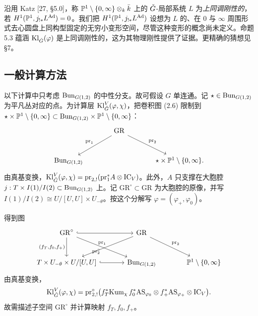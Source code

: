 \begin{remark}
沿用 Katz [27, §5.0]，称 $\mathbb{P}^1\setminus\{0,\infty\}\otimes_k\bar k$ 上的 $\check G$-局部系统 $L$ 为\emph{上同调刚性的}，若 $H^1(\mathbb{P}^1,j_{!*}L^{\mathrm{Ad}})=0$。我们把 $H^1(\mathbb{P}^1,j_{!*}L^{\mathrm{Ad}})$ 设想为 $L$ 的、在 $0$ 与 $\infty$ 周围形式去心圆盘上同构型固定的无穷小变形空间，尽管这种变形的概念尚未定义。命题 5.3 蕴涵 $\mathrm{Kl}_{\check G}(\varphi)$ 是上同调刚性的，这为其物理刚性提供了证据。更精确的猜想见 §7。
\end{remark}

\subsection{一般计算方法}

以下计算中只考虑 $\mathrm{Bun}_{G(1,2)}$ 的中性分支。故可假设 $G$ 单连通。记 $\star\in\mathrm{Bun}_{G(1,2)}$ 为平凡丛对应的点。为计算层 $\mathrm{Kl}^V_{\check G}(\varphi,\chi)$，把卷积图 (2.6) 限制到 $\star\times\mathbb{P}^1\setminus\{0,\infty\}\subset\mathrm{Bun}_{G(1,2)}\times\mathbb{P}^1\setminus\{0,\infty\}$：
\[
\begin{tikzcd}[column sep=large, row sep=large]
& \mathrm{GR} \arrow[dl, "\mathrm{pr}_1"'] \arrow[dr, "\mathrm{pr}_2"] & \\
\Bun_{G(1,2)} & & \star\times\PP^1\setminus\{0,\infty\}.
\end{tikzcd}
\]
由真基变换，$\mathrm{Kl}^V_{\check G}(\varphi,\chi)=\mathrm{pr}_{2,!}(\mathrm{pr}_1^*A\otimes\mathrm{IC}_V)$。此外，$A$ 只支撑在大胞腔 $j:T\times I(1)/I(2)\subset\mathrm{Bun}_{G(1,2)}$ 上。记 $\mathrm{GR}^\circ\subset\mathrm{GR}$ 为大胞腔的原像，并写 $I(1)/I(2)\cong U/[U,U]\times U_{-\theta}$。按这个分解写 $\varphi=(\varphi_+,\varphi_0)$。

得到图
\[
\begin{tikzcd}[column sep=large, row sep=large]
\mathrm{GR}^\circ \arrow[r, hook] \arrow[dr, "\mathrm{pr}^\circ_2"'] \arrow[d, "{(f_T,f_0,f_+)}"'] & \mathrm{GR} \arrow[dl, "\mathrm{pr}_1"'] \arrow[dr, "\mathrm{pr}_2"] & \\
T\times U_{-\theta}\times U/[U,U] \arrow[r, hook] & \Bun_{G(1,2)} & \PP^1\setminus\{0,\infty\}
\end{tikzcd}
\]
由真基变换，
\begin{equation}
\mathrm{Kl}^V_{\check G}(\varphi,\chi)=\mathrm{pr}^\circ_{2,!}\big(f_T^*\mathrm{Kum}_\chi\,f_0^*\mathrm{AS}_{\varphi_0}\otimes f_+^*\mathrm{AS}_{\varphi_+}\otimes\mathrm{IC}_V\big).
\end{equation}
故需描述子空间 $\mathrm{GR}^\circ$ 并计算映射 $f_T,f_0,f_+$。

